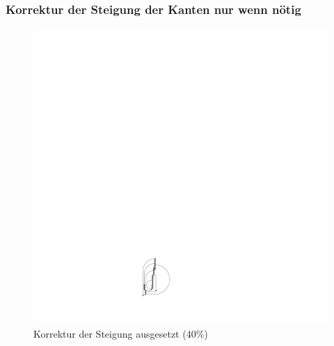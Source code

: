 \documentclass{beamer}
\begin{document}
\begin{frame}
  \frametitle{ Korrektur der Steigung der Kanten nur wenn nötig}
\begin{figure}[h]
  \centering
  \includegraphics[scale=.4]{hugeGraph/isSmaller}
  \caption{ Korrektur der Steigung ausgesetzt (40\%)}
  \label{fig:exampleAsmoothSimple}
\end{figure}
\end{frame}
\end{document}
